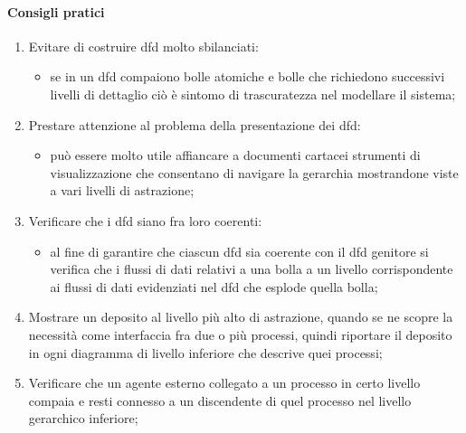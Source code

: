 \paragraph{Consigli pratici}\label{par:dfd_consigli_pratici} %
\begin{enumerate}
    \item Evitare di costruire \ac{dfd} molto sbilanciati:
        \begin{itemize}
            \item se in un \ac{dfd} compaiono bolle atomiche e bolle che richiedono successivi livelli di dettaglio ciò è sintomo di trascuratezza nel modellare il sistema;
        \end{itemize}
    \item Prestare attenzione al problema della presentazione dei \ac{dfd}:
        \begin{itemize}
            \item può essere molto utile affiancare a documenti cartacei strumenti di visualizzazione che consentano di navigare la gerarchia mostrandone viste a vari livelli di astrazione;
        \end{itemize}
    \item Verificare che i \ac{dfd} siano fra loro coerenti:
        \begin{itemize}
            \item al fine di garantire che ciascun \ac{dfd} sia coerente con il \ac{dfd} genitore si verifica che i flussi di dati relativi a una bolla a un livello corrispondente ai flussi di dati evidenziati nel \ac{dfd} che esplode quella bolla;
        \end{itemize}
    \item Mostrare un deposito al livello più alto di astrazione, quando se ne scopre la necessità come interfaccia fra due o più processi, quindi riportare il deposito in ogni diagramma di livello inferiore che descrive quei processi;
    \item Verificare che un agente esterno collegato a un processo in certo livello compaia e resti connesso a un discendente di quel processo nel livello gerarchico inferiore;
\end{enumerate}
%
